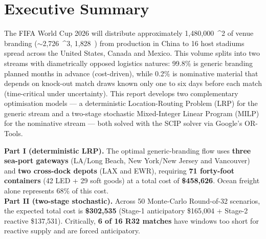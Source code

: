 \documentclass[11pt,a4paper]{article}
\numberwithin{equation}{section}
\newcommand{\USD}[1]{\$#1}
\newcommand{\mcube}{\text{m}^{3}}
\newcommand{\msq}{\text{m}^{2}}
\newcommand{\tonne}{\text{t}}
\begin{document}
\section*{Executive Summary}

The FIFA World Cup 2026 will distribute approximately 1{,}480{,}000~\msq{} of venue branding ($\sim$2{,}726~\mcube, 1{,}828~\tonne{}) from production in China to 16 host stadiums spread across the United States, Canada and Mexico. This volume splits into two streams with diametrically opposed logistics natures: 99.8\% is generic branding planned months in advance (cost-driven), while 0.2\% is nominative material that depends on knock-out match draws known only one to six days before each match (time-critical under uncertainty). This report develops two complementary optimisation models — a deterministic Location-Routing Problem (LRP) for the generic stream and a two-stage stochastic Mixed-Integer Linear Program (MILP) for the nominative stream — both solved with the SCIP solver via Google's OR-Tools.

\begin{headlinebox}
\textbf{Part I (deterministic LRP).} The optimal generic-branding flow uses \textbf{three sea-port gateways} (LA/Long Beach, New York/New Jersey and Vancouver) and \textbf{two cross-dock depots} (LAX and EWR), requiring \textbf{71 forty-foot containers} (42 LED + 29 soft goods) at a total cost of \textbf{\USD{458{,}626}}. Ocean freight alone represents 68\% of this cost.\\[4pt]
\textbf{Part II (two-stage stochastic).} Across 50 Monte-Carlo Round-of-32 scenarios, the expected total cost is \textbf{\USD{302{,}535}} (Stage-1 anticipatory \USD{165{,}004} + Stage-2 reactive \USD{137{,}531}). Critically, \textbf{6 of 16 R32 matches} have windows too short for reactive supply and are forced anticipatory.
\end{headlinebox}
\end{document}
